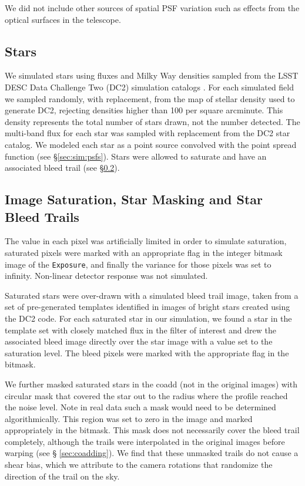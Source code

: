 \documentclass[twocolumn,twocolappendix,astrosym]{openjournal}
\newcommand{\calexp}{\texttt{Exposure}}
\begin{document}
We did not include other sources of spatial PSF variation such as effects from
the optical surfaces in the telescope.

\subsection{Stars} \label{sec:sim:stars}

We simulated stars using fluxes and Milky Way densities sampled from the LSST
DESC Data Challenge Two (DC2) simulation catalogs \citep{DC2Abolfathi2021}.
For each simulated field we sampled randomly, with replacement, from the map of
stellar density used to generate DC2, rejecting densities higher than 100 per
square arcminute.  This density represents the total number of stars drawn, not
the number detected.  The multi-band flux for each star was sampled with
replacement from the DC2 star catalog.  We modeled each star as a point
source convolved with the point spread function
(see \S \ref{sec:sim:psfs}).  Stars were allowed to saturate and have an
associated bleed trail (see \S \ref{sec:sim:satbleeds}).

\subsection{Image Saturation, Star Masking and Star Bleed Trails} \label{sec:sim:satbleeds}

The value in each pixel was artificially limited in order to simulate
saturation, saturated pixels were marked with an appropriate flag in the
integer bitmask image of the \calexp, and finally the variance for those
pixels was set to infinity.  Non-linear detector response was not simulated.

Saturated stars were over-drawn with a simulated bleed trail image, taken from
a set of pre-generated templates identified in images of bright stars created
using the DC2 code.  For each saturated star in our simulation, we found a star
in the template set with closely matched flux in the filter of interest and
drew the associated bleed image directly over the star image with a value set
to the saturation level.  The bleed pixels were marked with the appropriate
flag in the bitmask.

We further masked saturated stars in the coadd (not in the original images)
with circular mask that covered the star out to the radius where the profile
reached the noise level.  Note in real data such a mask would need to be
determined algorithmically. This region was set to zero in the image and
marked appropriately in the bitmask.   This mask does not necessarily cover the
bleed trail completely, although the trails were interpolated in the
original images before warping (see \S
\ref{sec:coadding}).  We find that these unmasked trails do not cause a shear
bias, which we attribute to the camera rotations that randomize the direction
of the trail on the sky.
\end{document}
